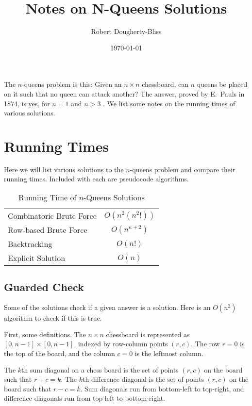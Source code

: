 \documentclass{article}
\begin{document}
\title{Notes on N-Queens Solutions}
\author{Robert Dougherty-Bliss}
\date{\today}
\maketitle

The $n$-queens problem is this: Given an $n \times n$ chessboard, can $n$
queens be placed on it such that no queen can attack another? The answer,
proved by E.~Pauls in 1874, is yes, for $n = 1$ and $n > 3$
\cite{jordanbell07}. We list some notes on the running times of various
solutions.

\section*{Running Times}
\label{sec:running_times}

Here we will list various solutions to the $n$-queens problem and compare their
running times. Included with each are pseudocode algorithms.

\begin{table}[h]
 \caption{Running Time of $n$-Queens Solutions}
 \centering
 \begin{tabular}{lc}
     \hline
     Combinatoric Brute Force & $O(n^2(n^2!))$ \\
     Row-based Brute Force & $O(n^{n+2})$ \\
     Backtracking & $O(n!)$ \\
     Explicit Solution & $O(n)$ \\
     \hline
 \end{tabular}
\end{table}

\subsection*{Guarded Check}
\label{sub:guarded_check}

Some of the solutions check if a given answer is a solution. Here is an
$O(n^2)$ algorithm to check if this is true.

First, some definitions. The $n \times n$ chessboard is represented as $[0, n-1]
\times [0, n-1]$, indexed by row-column points $(r, c)$. The row $r = 0$ is the
top of the board, and the column $c = 0$ is the leftmost column.

The $k$th sum diagonal on a chess board is the set of points $(r, c)$ on the
board such that $r + c = k$. The $k$th difference diagonal is the set of points
$(r, c)$ on the board such that $r - c = k$. Sum diagonals run from bottom-left
to top-right, and difference diagonals run from top-left to bottom-right.
\end{document}
